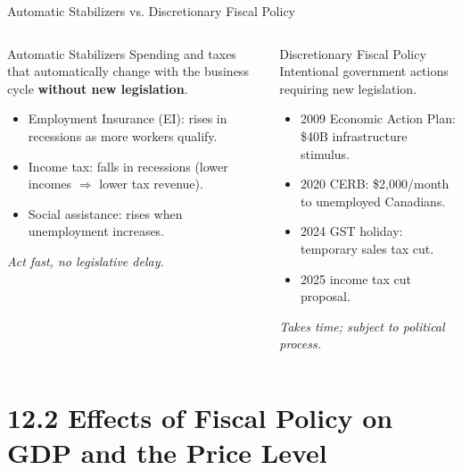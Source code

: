 \documentclass[aspectratio=169]{beamer}
\begin{document}
\begin{frame}{Automatic Stabilizers vs. Discretionary Fiscal Policy}
\transfade
\begin{columns}
\begin{block}{\textcolor{leafgreen}{Automatic Stabilizers}}
Spending and taxes that automatically change with the business cycle \textbf{without new legislation}.
\begin{itemize}
  \item Employment Insurance (EI): rises in recessions as more workers qualify.
  \item Income tax: falls in recessions (lower incomes $\Rightarrow$ lower tax revenue).
  \item Social assistance: rises when unemployment increases.
\end{itemize}
\textit{Act fast, no legislative delay.}
\end{block}
\begin{block}{\textcolor{deeporange}{Discretionary Fiscal Policy}}
Intentional government actions requiring new legislation.
\begin{itemize}
  \item 2009 Economic Action Plan: \$40B infrastructure stimulus.
  \item 2020 CERB: \$2{,}000/month to unemployed Canadians.
  \item 2024 GST holiday: temporary sales tax cut.
  \item 2025 income tax cut proposal.
\end{itemize}
\textit{Takes time; subject to political process.}
\end{block}
\end{columns}
\end{frame}

\section{12.2 Effects of Fiscal Policy on GDP and the Price Level}
\end{document}
